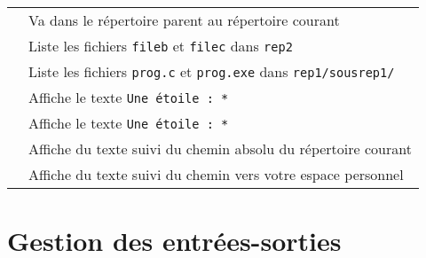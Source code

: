 \documentclass [a4paper]{article}
\begin{document}
\begin{tabular}{ ll }
\hspace{0.5cm}{\verb+cd ..+}                        & Va dans le répertoire parent au répertoire courant\\
\hspace{0.5cm}{\verb+ls ../../rep2/file?+}          & Liste les fichiers \verb+fileb+ et \verb+filec+ dans \verb+rep2+ \\
\hspace{0.5cm}{\verb+ls prog.*+}                    & Liste les fichiers \verb+prog.c+ et \verb+prog.exe+ dans \verb+rep1/sousrep1/+ \\
\hspace{0.5cm}{\verb+echo Une étoile : \*+}         & Affiche le texte \og{} \verb+Une étoile : *+ \fg{} \\
\hspace{0.5cm}{\verb+echo "Une étoile : *"+}        & Affiche le texte \og{} \verb+Une étoile : *+ \fg{} \\
\hspace{0.5cm}{\verb+echo "Je suis dans `pwd`"+}    & Affiche du texte suivi du chemin absolu du répertoire courant\\
\hspace{0.5cm}{\verb+echo "J'habite dans $HOME"+}   & Affiche du texte suivi du chemin vers votre espace personnel \\
\hline
\end{tabular}


\section*{Gestion des entrées-sorties}
\end{document}
